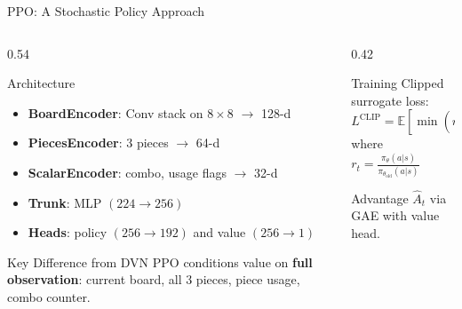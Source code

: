 \documentclass[aspectratio=169,10pt]{beamer}
\begin{document}
\begin{frame}{PPO: A Stochastic Policy Approach}
\begin{columns}[T]
\begin{column}{0.54\textwidth}
\begin{block}{Architecture}
\begin{itemize}
    \item \textbf{BoardEncoder}: Conv stack on $8\times8$ $\to$ 128-d
    \item \textbf{PiecesEncoder}: 3 pieces $\to$ 64-d
    \item \textbf{ScalarEncoder}: combo, usage flags $\to$ 32-d
    \item \textbf{Trunk}: MLP $(224 \to 256)$
    \item \textbf{Heads}: policy $(256 \to 192)$ and value $(256 \to 1)$
\end{itemize}
\end{block}

\vspace{0.3em}
\begin{exampleblock}{Key Difference from DVN}
PPO conditions value on \textbf{full observation}: current board, all 3 pieces, piece usage, combo counter.
\end{exampleblock}
\end{column}

\begin{column}{0.42\textwidth}
\begin{block}{Training}
Clipped surrogate loss:
\[
L^{\text{CLIP}} = \mathbb{E}[\min(r_t \hat{A}_t, \text{clip}(r_t) \hat{A}_t)]
\]
where $r_t = \frac{\pi_\theta(a|s)}{\pi_{\theta_{\text{old}}}(a|s)}$

\vspace{0.3em}
Advantage $\hat{A}_t$ via GAE with value head.
\end{block}
\end{column}
\end{columns}
\end{frame}
\end{document}
